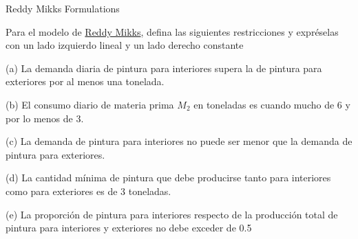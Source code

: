 \begin{frameact}{Reddy Mikks Formulations}{}

\label{act:taha_02-02A-03}
  Para el modelo de \hyperlink{example:reddy-mikks}{Reddy Mikks}, defina las siguientes restricciones y expréselas con un lado izquierdo lineal y un lado derecho constante

(a) La demanda diaria de pintura para interiores supera la de pintura para exteriores
por al menos una tonelada.

(b) El consumo diario de materia prima $M_2$ en toneladas es cuando mucho de 6 y por
lo menos de 3.

(c) La demanda de pintura para interiores no puede ser menor que la demanda de pintura para exteriores.

(d) La cantidad mínima de pintura que debe producirse tanto para interiores como para exteriores es de 3 toneladas.

(e) La proporción de pintura para interiores respecto de la producción total de pintura
para interiores y exteriores no debe exceder de 0.5

\end{frameact}


